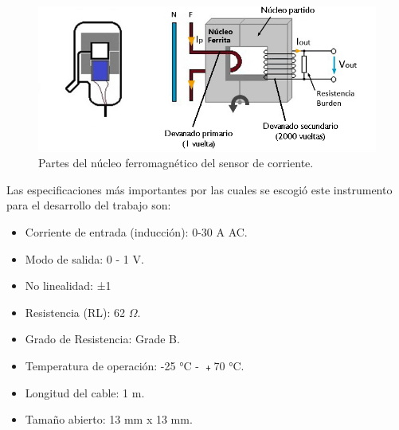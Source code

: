 \begin{figure}[htpb]
\centering 
\includegraphics[width=1.0\textwidth]{./Figures/espiras.jpg}
\caption{Partes del núcleo ferromagnético del sensor de corriente.}
\label{fig:espiras}
\end{figure}

Las especificaciones más importantes por las cuales se escogió este instrumento para el desarrollo del trabajo son:

\begin{itemize}
\item Corriente de entrada (inducción): 0-30 A AC.
\item Modo de salida: 0 - 1 V.
\item No linealidad: ±1%
\item Resistencia (RL): 62 $\Omega $.
\item Grado de Resistencia: Grade B.
\item Temperatura de operación: -25 °C - ﹢70 °C.
\item Longitud del cable: 1 m.
\item Tamaño abierto: 13 mm x 13 mm.
\end{itemize}





